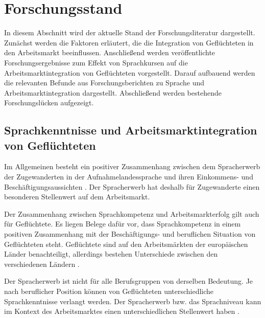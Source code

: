 \chapter{Forschungsstand}
\label{cha:forschungsstand}

In diesem Abschnitt wird der aktuelle Stand der Forschungsliteratur dargestellt. Zunächst werden die Faktoren erläutert, die die Integration von Geflüchteten in den Arbeitsmarkt beeinflussen. Anschließend werden veröffentlichte Forschungsergebnisse zum Effekt von Sprachkursen auf die Arbeitsmarktintegration von Geflüchteten vorgestellt. Darauf aufbauend werden die relevanten Befunde aus Forschungsberichten zu Sprache und Arbeitsmarktintegration dargestellt. Abschließend werden bestehende Forschungslücken aufgezeigt.

\section{Sprachkenntnisse und Arbeitsmarktintegration von Geflüchteten}
\label{cha:arbeitsmarktintegration}

Im Allgemeinen besteht ein positiver Zusammenhang zwischen dem Spracherwerb der Zugewanderten in der Aufnahmelandessprache und ihren Einkommens- und Beschäftigungsaussichten \parencites{doi:10.1086/298374}{10.1111/1468-0297.t01-1-00151}. Der Spracherwerb hat deshalb für Zugewanderte einen besonderen Stellenwert auf dem Arbeitsmarkt.

Der Zusammenhang zwischen Sprachkompetenz und Arbeitsmarkterfolg gilt auch für Geflüchtete. Es liegen Belege dafür vor, dass Sprachkompetenz in einem positiven Zusammenhang mit der Beschäftigungs- und beruflichen Situation von Geflüchteten steht. Geflüchtete sind auf den Arbeitsmärkten der europäischen Länder benachteiligt, allerdings bestehen Unterschiede zwischen den verschiedenen Ländern \parencites{dumont2016refugees}{doi:10.1111/j.1747-7379.2010.00810.x}.

Der Spracherwerb ist nicht für alle Berufsgruppen von derselben Bedeutung. Je nach beruflicher Position können von Geflüchteten unterschiedliche Sprachkenntnisse verlangt werden. Der Spracherwerb bzw. das Sprachniveau kann im Kontext des Arbeitsmarktes einen unterschiedlichen Stellenwert haben \parencite{chiswick2010occupational}.

